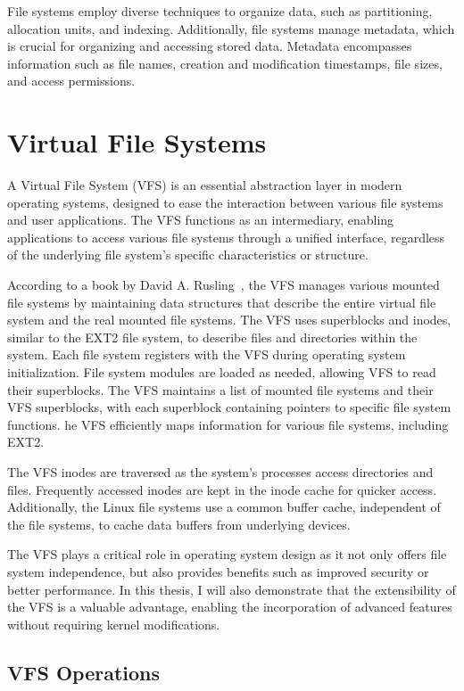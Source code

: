 File systems employ diverse techniques to organize data, such as partitioning, allocation units, and indexing.
Additionally, file systems manage metadata, which is crucial for organizing and accessing stored data.
Metadata encompasses information such as file names, creation and modification timestamps, file sizes, and access permissions.


\section{Virtual File Systems}\label{sec:virtual-file-systems}

A Virtual File System (VFS) is an essential abstraction layer in modern operating systems, designed to ease the interaction between various file systems and user applications.
The VFS functions as an intermediary, enabling applications to access various file systems through a unified interface, regardless of the underlying file system's specific characteristics or structure.

According to a book by David A. Rusling~\cite{rusling-linux}, the VFS manages various mounted file systems by maintaining data structures that describe the entire virtual file system and the real mounted file systems.
The VFS uses superblocks and inodes, similar to the EXT2 file system, to describe files and directories within the system.
Each file system registers with the VFS during operating system initialization.
File system modules are loaded as needed, allowing VFS to read their superblocks.
The VFS maintains a list of mounted file systems and their VFS superblocks, with each superblock containing pointers to specific file system functions.
he VFS efficiently maps information for various file systems, including EXT2.

The VFS inodes are traversed as the system's processes access directories and files.
Frequently accessed inodes are kept in the inode cache for quicker access.
Additionally, the Linux file systems use a common buffer cache, independent of the file systems, to cache data buffers from underlying devices.

The VFS plays a critical role in operating system design as it not only offers file system independence, but also provides benefits such as improved security or better performance.
In this thesis, I will also demonstrate that the extensibility of the VFS is a valuable advantage, enabling the incorporation of advanced features without requiring kernel modifications.

\subsection{VFS Operations}\label{subsec:vfs-operations}

